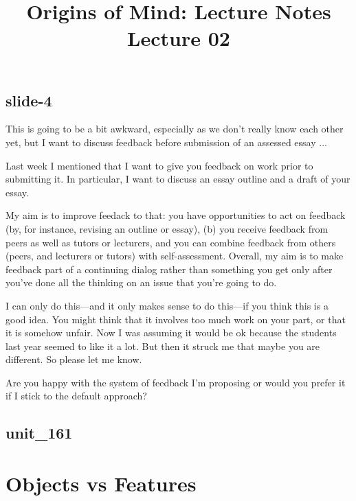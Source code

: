 \documentclass[12pt,\papersize]{extarticle}
\begin{document}
\setlength\footnotesep{1em}







      \title {Origins of Mind: Lecture Notes \\ Lecture 02}
 
 
 
\maketitle
 
\subsection{slide-4}
This is going to be a bit awkward, especially as we don't really know each other yet, 
but I want to discuss feedback before submission of an assessed essay ...
 
Last week I mentioned that I want to give you feedback on work prior to submitting it.
In particular, I want to discuss an essay outline and a draft of your essay.
 
My aim is to improve feedack to that: you  have opportunities to act on feedback (by, 
for instance, revising an outline or essay), (b) you receive feedback from peers as well as 
tutors or lecturers, and you can combine feedback from others (peers, and lecturers or 
tutors) with self-assessment.
Overall, my aim is to make feedback part of a continuing dialog rather than something you get
only after you've done all the thinking on an issue that you're going to do.
 
I can only do this---and it only makes sense to do this---if you think this is a good idea.
You might think that it involves too much work on your part, or that it is somehow unfair.
Now I was assuming it would be ok because the students last year seemed to like it a lot.
But then it struck me that maybe you are different.  So please let me know.
 
Are you happy with the system of feedback I'm proposing or would you prefer it if I stick to 
the default approach?
 
\subsection{unit\_161}
 
 
\section{Objects vs Features}
 
\end{document}
